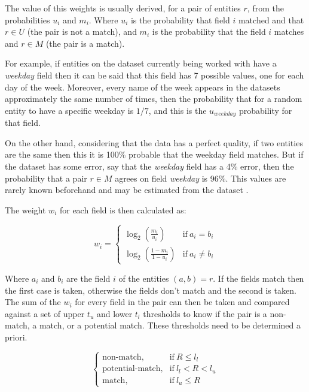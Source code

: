 \documentclass[epsfig,a4paper,11pt,titlepage,twoside,openany]{book}
\begin{document}
The value of this weights is usually derived, for a pair of entities $r$, from the probabilities $u_i$ and $m_i$. Where $u_i$ is the probability that field $i$ matched and that $r \in U$ (the pair is not a match), and $m_i$ is the probability that the field $i$ matches and $r \in M$ (the pair is a match).

For example, if entities on the dataset currently being worked with have a \textit{weekday} field then it can be said that this field has 7 possible values, one for each day of the week. Moreover, every name of the week appears in the datasets approximately the same number of times, then the probability that for a random entity to have a specific weekday is $1/7$, and this is the $u_{weekday}$ probability for that field.

On the other hand, considering that the data has a perfect quality, if two entities are the same then this it is 100\% probable that the weekday field matches. But if the dataset has some error, say that the \textit{weekday} field has a 4\% error, then the probability that a pair $r \in M$ agrees on field \textit{weekday} is 96\%. This values are rarely known beforehand and may be estimated from the dataset \cite{christen12_data}.

The weight $w_i$ for each field is then calculated as:

\begin{equation*}
  w_i = \begin{cases}
    \log_2(\frac{m_i}{u_i}) & \text{if}\ a_i = b_i \\
    \log_2(\frac{1- m_i}{1-u_i}) & \text{if}\ a_i \neq b_i 
    \end{cases}
\end{equation*}

Where $a_i$ and $b_i$ are the field $i$ of the entities $(a,b) = r$. If the fields match then the first case is taken, otherwise the fields don't match and the second is taken. The sum of the $w_i$ for every field in the pair can then be taken and compared against a set of upper $t_u$ and lower $t_l$ thresholds to know if the pair is a non-match, a match, or a potential match. These thresholds need to be determined a priori.

\begin{equation*}
  \begin{cases}
    \text{non-match}, & \text{if}\ R \leq l_l \\
    \text{potential-match}, & \text{if}\ l_l < R < l_u \\
    \text{match}, & \text{if}\ l_u \leq R 
  \end{cases}
\end{equation*}
\end{document}
